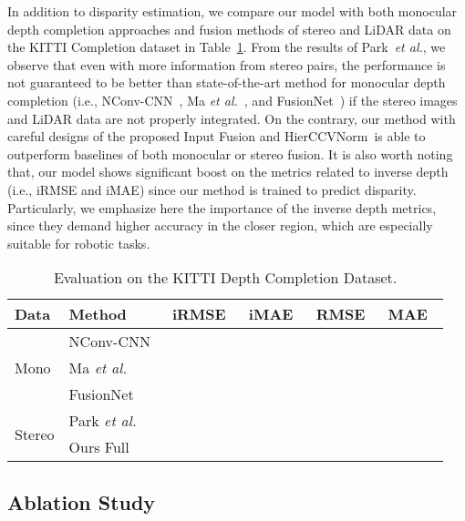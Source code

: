 \documentclass[letterpaper, 10 pt, conference]{ieeeconf}
\newcommand{\modelNameIncat}{Input Fusion }
\newcommand{\modelNameHierCBNPunc}{HierCCVNorm}
\newcommand{\tabref}{Table~\ref}
\newcommand{\etal}{\textit{et al.}}
\begin{document}
{{{In addition to disparity estimation, we compare our model with both monocular depth completion approaches and fusion methods of stereo and LiDAR data on the KITTI Completion dataset in \tabref{tab:kitti_completion}. From the results of Park~\etal, we observe that even with more information from stereo pairs, the performance is not guaranteed to be better than state-of-the-art method for monocular depth completion (i.e., NConv-CNN~\cite{depthnconv}, Ma \etal~\cite{depthsss2d}, and FusionNet~\cite{depthrgbguide}) if the stereo images and LiDAR data are not properly integrated. On the contrary, our method with careful designs of the proposed \modelNameIncat and \modelNameHierCBNPunc~is able to outperform baselines of both monocular or stereo fusion. It is also worth noting that, our model shows significant boost on the metrics related to inverse depth (i.e., iRMSE and iMAE) since our method is trained to predict disparity. Particularly, we emphasize here the importance of the inverse depth metrics, since they demand higher accuracy in the closer region, which are especially suitable for robotic tasks.



}
}

\begin{table}[!t]
\centering\scriptsize
\caption{\small{Evaluation on the KITTI Depth Completion Dataset.}}
\begin{tabular}{l l | c c c c}
\hline
Data & Method & iRMSE~ & iMAE~ & RMSE~ & MAE~ \\ \hline \hline
\multirow{3}{*}{Mono} & NConv-CNN~\cite{depthnconv} &  &  &  &  \\
 & Ma \textit{et al.}~\cite{depthsss2d} &  &  &  &  \\
 & FusionNet~\cite{depthrgbguide} &  &  &  &  \\ \hline
\multirow{2}{*}{Stereo} & Park \textit{et al.}~\cite{LiDARstereoicra18} &  &  &  &  \\
& Ours Full &  &  &  &  \\
\hline
\end{tabular}
\small
\label{tab:kitti_completion}
\end{table}

\subsection{Ablation Study}{

}}
\end{document}

